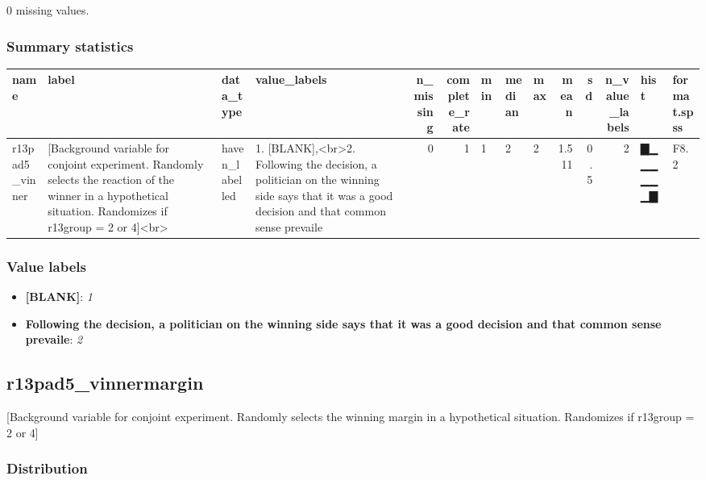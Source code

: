 \documentclass[
]{book}
\providecommand{\tightlist}{%
  \setlength{\itemsep}{0pt}\setlength{\parskip}{0pt}}
\begin{document}
0 missing values.

\hypertarget{r13pad5_vinner_summary}{%
\subsubsection{Summary statistics}\label{r13pad5_vinner_summary}}

\begin{tabular}{l|l|l|l|r|r|l|l|l|r|r|r|l|l}
\hline
name & label & data_type & value_labels & n_missing & complete_rate & min & median & max & mean & sd & n_value_labels & hist & format.spss\\
\hline
r13pad5_vinner & [Background variable for conjoint experiment. Randomly selects the reaction of the winner in a hypothetical situation. Randomizes if r13group = 2 or 4]<br> & haven_labelled & 1. [BLANK],<br>2. Following the decision, a politician on the winning side says that it was a good decision and that common sense prevaile & 0 & 1 & 1 & 2 & 2 & 1.511 & 0.5 & 2 & ▇▁▁▁▁▁▁▇ & F8.2\\
\hline
\end{tabular}

\hypertarget{r13pad5_vinner_labels}{%
\subsubsection{Value labels}\label{r13pad5_vinner_labels}}

\begin{itemize}
\tightlist
\item
  \textbf{{[}BLANK{]}}: \emph{1}
\item
  \textbf{Following the decision, a politician on the winning side says that it was a good decision and that common sense prevaile}: \emph{2}
\end{itemize}

\hypertarget{r13pad5_vinnermargin}{%
\subsection{r13pad5\_vinnermargin}\label{r13pad5_vinnermargin}}

{[}Background variable for conjoint experiment. Randomly selects the winning margin in a hypothetical situation. Randomizes if r13group = 2 or 4{]}

\hypertarget{r13pad5_vinnermargin_distribution}{%
\subsubsection{Distribution}\label{r13pad5_vinnermargin_distribution}}
\end{document}
